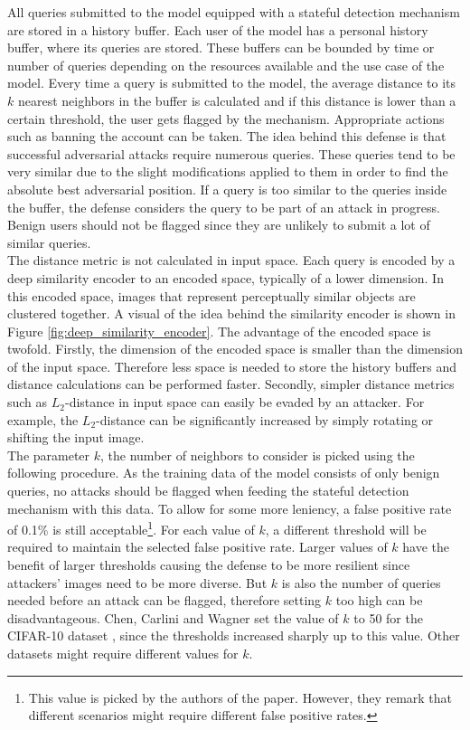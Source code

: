 All queries submitted to the model equipped with a stateful detection mechanism are stored in a history buffer. Each user of the model has a personal history buffer, where its queries are stored. These buffers can be bounded by time or number of queries depending on the resources available and the use case of the model. Every time a query is submitted to the model, the average distance to its $k$ nearest neighbors in the buffer is calculated and if this distance is lower than a certain threshold, the user gets flagged by the mechanism. Appropriate actions such as banning the account can be taken. The idea behind this defense is that successful adversarial attacks require numerous queries. These queries tend to be very similar due to the slight modifications applied to them in order to find the absolute best adversarial position. If a query is too similar to the queries inside the buffer, the defense considers the query to be part of an attack in progress. Benign users should not be flagged since they are unlikely to submit a lot of similar queries.\\

The distance metric is not calculated in input space. Each query is encoded by a deep similarity encoder \cite{deep_similarity_encoder} to an encoded space, typically of a lower dimension. In this encoded space, images that represent perceptually similar objects are clustered together. A visual of the idea behind the similarity encoder is shown in Figure \ref{fig:deep_similarity_encoder}. The advantage of the encoded space is twofold. Firstly, the dimension of the encoded space is smaller than the dimension of the input space. Therefore less space is needed to store the history buffers and distance calculations can be performed faster. Secondly, simpler distance metrics such as $L_2$-distance in input space can easily be evaded by an attacker. For example, the $L_2$-distance can be significantly increased by simply rotating or shifting the input image.\\

The parameter $k$, the number of neighbors to consider is picked using the following procedure. As the training data of the model consists of only benign queries, no attacks should be flagged when feeding the stateful detection mechanism with this data. To allow for some more leniency, a false positive rate of 0.1\% is still acceptable\footnote{This value is picked by the authors of the paper. However, they remark that different scenarios might require different false positive rates.}. For each value of $k$, a different threshold will be required to maintain the selected false positive rate. Larger values of $k$ have the benefit of larger thresholds causing the defense to be more resilient since attackers' images need to be more diverse. But $k$ is also the number of queries needed before an attack can be flagged, therefore setting $k$ too high can be disadvantageous. Chen, Carlini and Wagner set the value of $k$ to 50 for the CIFAR-10  dataset \cite{cifar}, since the thresholds increased sharply up to this value. Other datasets might require different values for $k$.

